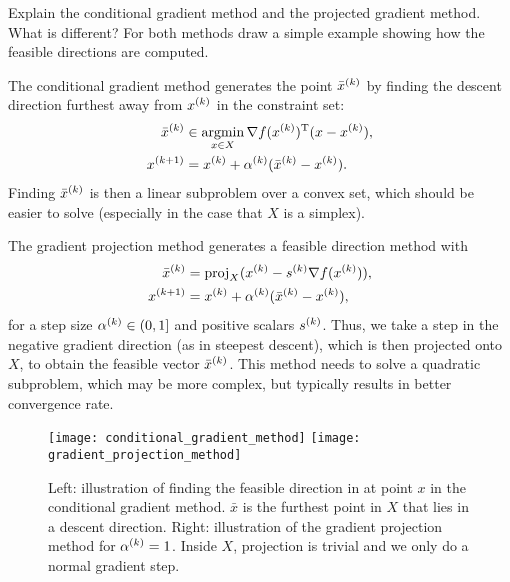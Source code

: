 \documentclass{article}
\begin{document}
\begin{question}
  Explain the conditional gradient method and the projected gradient method.  What is different? For
  both methods draw a simple example showing how the feasible directions are computed.
\end{question}

The conditional gradient method generates the point \(\kth{\bar{x}}\) by finding the descent
direction furthest away from \(\kth{x}\) in the constraint set:
\begin{align*}
  \kth{\bar{x}} &\in \argmin_{x \in X} \T{\nabla f(\kth{x})}(x - \kth{x}), \\
  \kth[k+1]{x} &= \kth{x} + \kth{\alpha}(\kth{\bar{x}} - \kth{x}).
\end{align*}
Finding \(\kth{\bar{x}}\) is then a linear subproblem over a convex set, which should be easier to
solve (especially in the case that \(X\) is a simplex).

The gradient projection method generates a feasible direction method with
\begin{align*}
  \kth{\bar{x}} &= \proj_X (\kth{x} - \kth{s} \nabla f(\kth{x})), \\
  \kth[k+1]{x} &= \kth{x} + \kth{\alpha}(\kth{\bar{x}} - \kth{x}),
\end{align*}
for a step size \(\kth{\alpha} \in (0, 1]\) and positive scalars \(\kth{s}\).  Thus, we take a step
in the negative gradient direction (as in steepest descent), which is then projected onto \(X\), to
obtain the feasible vector \(\kth{\bar{x}}\).  This method needs to solve a quadratic subproblem,
which may be more complex, but typically results in better convergence rate.

\begin{figure}[H]
  \centering
  \texttt{[image: conditional\_gradient\_method]}
  \hspace{1em}
  \texttt{[image: gradient\_projection\_method]}
  \caption{Left: illustration of finding the feasible direction in at point \(x\) in the conditional
    gradient method. \(\bar{x}\) is the furthest point in \(X\) that lies in a descent direction.
    Right: illustration of the gradient projection method for \(\kth{\alpha} = 1\).  Inside \(X\),
    projection is trivial and we only do a normal gradient
    step.\label{fig:feasible-direction-methods}}
\end{figure}
\end{document}
